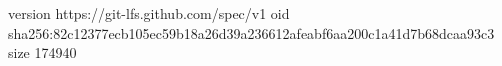 version https://git-lfs.github.com/spec/v1
oid sha256:82c12377ecb105ec59b18a26d39a236612afeabf6aa200c1a41d7b68dcaa93c3
size 174940
